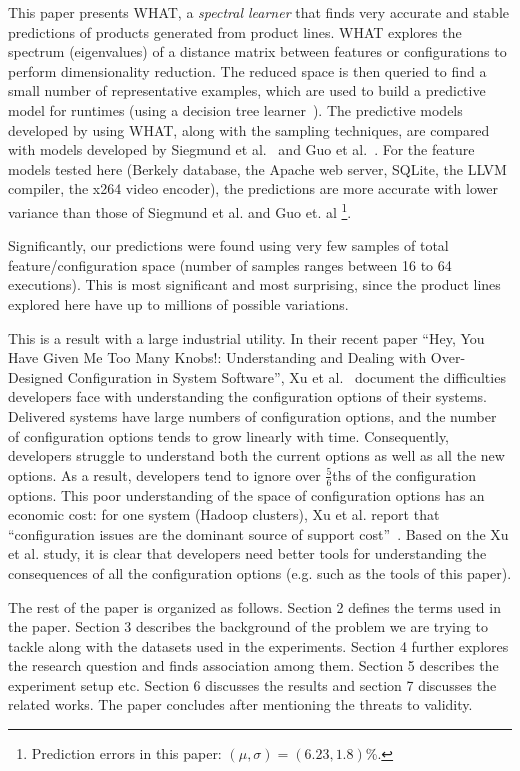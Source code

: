 \documentclass{sig-alternative}
\begin{document}
This paper presents WHAT, a {\em spectral learner}     that finds very
accurate and  stable predictions of products generated from  product lines.
WHAT explores the spectrum (eigenvalues) of a distance matrix
between  features or configurations to perform dimensionality reduction. The reduced
space is then queried to find a small number of representative examples, which are used to
build a predictive model for runtimes (using a decision tree learner~\cite{breiman1984}). The predictive models developed by using WHAT, along with the sampling techniques, are compared with models developed by Siegmund et al.~\cite{siegmund2012predicting} and Guo et al.~\cite{guo2013variability}. 
For the feature models tested here (Berkely database, the Apache web server, SQLite, the LLVM compiler, the x264 video encoder),
the  predictions are more accurate with lower variance than those of Siegmund et al. and Guo et. al \footnote{Prediction errors in this paper: $(\mu,\sigma) = (6.23,1.8)$\%.}.


Significantly, our predictions were found using   very few samples of total feature/configuration space
(number of samples ranges between 16 to 64 executions).
This is most significant and most surprising,  since the product lines explored here have up
to millions of possible variations. 

This is a result with a large industrial utility.
In their recent paper ``Hey, You Have Given Me Too Many Knobs!: Understanding and Dealing with Over-Designed Configuration in System Software'', Xu et al.~\cite{xu2015hey} document the  difficulties developers face
with understanding  the configuration options of their systems.
Delivered systems have large numbers of configuration options, and the number of  configuration options tends to grow linearly
with time. Consequently, developers  struggle to understand both the current options as well as all the new options.
As a result, developers tend to ignore over $\frac{5}{6}$ths of the configuration options. 
This poor understanding of the space of configuration options has an economic cost:  for one system (Hadoop clusters),  Xu et al. report that ``configuration
issues are the dominant source of support cost''~\cite{xu2015hey}. 
Based on the Xu et al. study, it is clear that developers need better tools for understanding the 
consequences of all the configuration options (e.g. such as   the tools of this paper).



The rest of the paper is organized as follows. Section 2 defines the terms used in the paper. Section 3 describes the background of the problem we are trying to tackle along with the datasets used in the experiments. Section 4 further explores the research question and finds association among them. Section 5 describes the experiment setup etc. Section 6 discusses the results and section 7 discusses the related works. The paper concludes after mentioning the threats to validity.
\end{document}

